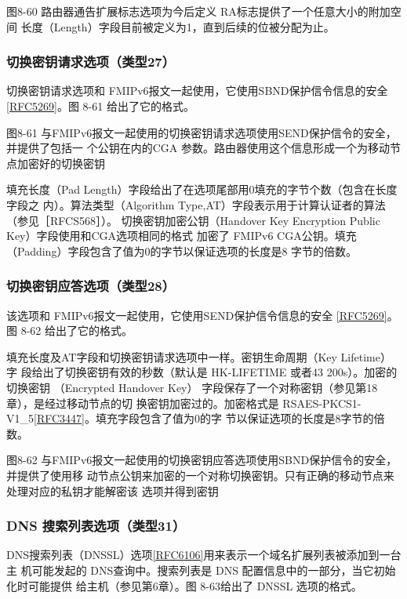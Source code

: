 图8-60 路由器通告扩展标志选项为今后定义 RA标志提供了一个任意大小的附加空间
长度（Length）字段目前被定义为1，直到后续的位被分配为止。

\subsubsection{切换密钥请求选项（类型27）}
切换密钥请求选项和 FMIPv6报文一起使用，它使用SBND保护信令信息的安全
\href{https://www.rfc-editor.org/rfc/rfc5269}{[RFC5269]}。图 8-61 给出了它的格式。

图8-61 与FMIPv6报文一起使用的切换密钥请求选项使用SEND保护信令的安全，并提供了包括一
个公钥在内的CGA 参数。路由器使用这个信息形成一个为移动节点加密好的切换密钥

填充长度（Pad Length）字段给出了在选项尾部用0填充的字节个数（包含在长度字段之
内）。算法类型（Algorithm Type,AT）字段表示用于计算认证者的算法（参见［RFCS568］）。
切换密钥加密公钥（Handover Key Encryption Public Key）字段使用和CGA选项相同的格式
加密了 FMIPv6 CGA公钥。填充（Padding）字段包含了值为0的字节以保证选项的长度是8
字节的倍数。

\subsubsection{切换密钥应答选项（类型28）}
该选项和 FMIPv6报文一起使用，它使用SEND保护信令信息的安全 \href{https://www.rfc-editor.org/rfc/rfc5269}{[RFC5269]}。
图 8-62 给出了它的格式。

填充长度及AT字段和切换密钥请求选项中一样。密钥生命周期（Key Lifetime）字
段给出了切换密钥有效的秒数（默认是 HK-LIFETIME 或者43 200s）。加密的切换密钥
（Encrypted Handover Key） 字段保存了一个对称密钥（参见第18章），是经过移动节点的切
换密钥加密过的。加密格式是 RSAES-PKCS1-V1\_5\href{https://www.rfc-editor.org/rfc/rfc3447}{[RFC3447]}。填充字段包含了值为0的字
节以保证选项的长度是8字节的倍数。

图8-62 与FMIPv6报文一起使用的切换密钥应答选项使用SBND保护信令的安全，并提供了使用移
动节点公钥来加密的一个对称切换密钥。只有正确的移动节点来处理对应的私钥才能解密该
选项并得到密钥

\subsubsection{DNS 搜索列表选项（类型31）}
DNS搜索列表（DNSSL）选项\href{https://www.rfc-editor.org/rfc/rfc6106}{[RFC6106]}用来表示一个域名扩展列表被添加到一台主
机可能发起的 DNS查询中。搜索列表是 DNS 配置信息中的一部分，当它初始化时可能提供
给主机（参见第6章）。图 8-63给出了 DNSSL 选项的格式。

